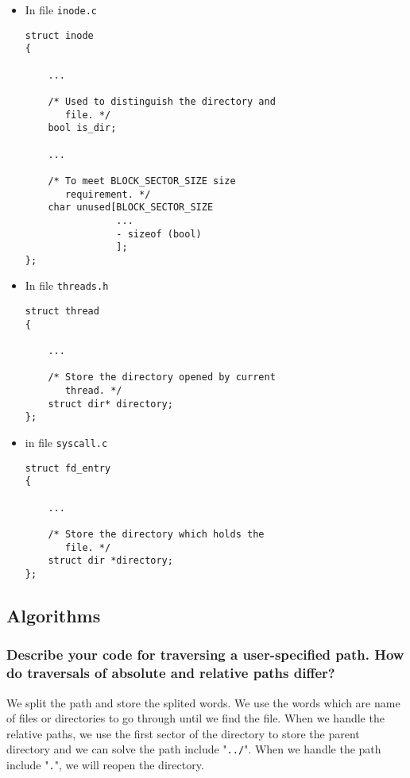 \documentclass[sigconf, nonacm, balance=false, urlbreakonhyphens=true]{acmart}
\begin{document}
                \begin{itemize}
                    \item In file \texttt{inode.c}
\begin{verbatim}
struct inode
{

    ...

    /* Used to distinguish the directory and 
       file. */
    bool is_dir;
    
    ...

    /* To meet BLOCK_SECTOR_SIZE size 
       requirement. */
    char unused[BLOCK_SECTOR_SIZE
                ...
                - sizeof (bool)              
                ];
};
\end{verbatim}
                \end{itemize}

 \begin{itemize}
                    \item In file \texttt{threads.h}
\begin{verbatim}
struct thread
{

    ...

    /* Store the directory opened by current
       thread. */
    struct dir* directory;
};

\end{verbatim}
                    \end{itemize}
\begin{itemize}
    \item in file \texttt{syscall.c}
\begin{verbatim}
struct fd_entry
{

    ...

    /* Store the directory which holds the 
       file. */
    struct dir *directory;
};
\end{verbatim}
\end{itemize}
        \subsection{Algorithms}

            \subsubsection{Describe your code for traversing a user-specified path.  How do traversals of absolute and relative paths differ? } 
            
                We split the path and store the splited words. We use the words which are name of files or directories to go through until we find the file. When we handle the relative paths, we use the first sector of the directory to store the parent directory and we can solve the path include "\texttt{../}". When we handle the path include "\texttt{.}", we will reopen the directory.
                
\end{document}
